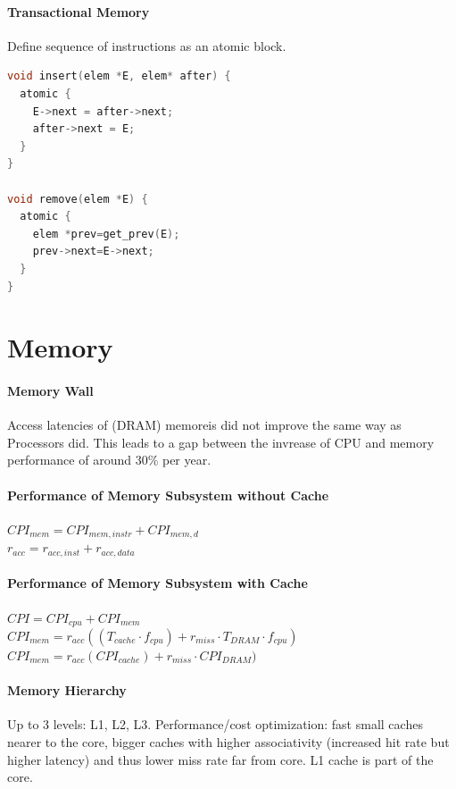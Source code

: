\documentclass[8pt]{extarticle}
\begin{document}
\begin{multicols*}{4}
\paragraph{Transactional Memory} Define sequence of instructions as an atomic block.

\begin{lstlisting}[language=c, numbers=none]
void insert(elem *E, elem* after) {
  atomic {
    E->next = after->next;
    after->next = E;
  }
}

void remove(elem *E) {
  atomic {
    elem *prev=get_prev(E);
    prev->next=E->next;
  }
}
\end{lstlisting} %


\section{Memory}

\paragraph{Memory Wall} Access latencies of (DRAM) memoreis did not improve the same way as Processors did. This leads to a gap between the invrease of CPU and memory performance of around 30\% per year.

\paragraph{Performance of Memory Subsystem without Cache} 
$CPI_{mem} = CPI_{mem,instr} + CPI_{mem,d}$ \\
$r_{acc} = r_{acc,inst} + r_{acc,data}$

\paragraph{Performance of Memory Subsystem with Cache} 
$CPI = CPI_{cpu} + CPI_{mem}$ \\
$CPI_{mem} = r_{acc}((T_{cache} \cdot f_{cpu}) + r_{miss} \cdot T_{DRAM} \cdot f_{cpu})$ \\
$CPI_{mem} = r_{acc}(CPI_{cache}) + r_{miss} \cdot CPI_{DRAM})$

\paragraph{Memory Hierarchy} Up to 3 levels: L1, L2, L3. Performance/cost optimization: fast small caches nearer to the core, bigger caches with higher associativity (increased hit rate but higher latency) and thus lower miss rate far from core. L1 cache is part of the core.


\end{multicols*}
\end{document}
